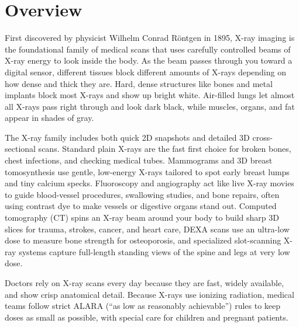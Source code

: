 \label{ch:infographic-xray-imaging-overview}

\section{Overview}

First discovered by physicist Wilhelm Conrad R\"ontgen in 1895, X-ray imaging is the foundational family of medical scans that uses carefully controlled beams of X-ray energy to look inside the body. As the beam passes through you toward a digital sensor, different tissues block different amounts of X-rays depending on how dense and thick they are. Hard, dense structures like bones and metal implants block most X-rays and show up bright white. Air-filled lungs let almost all X-rays pass right through and look dark black, while muscles, organs, and fat appear in shades of gray.

The X-ray family includes both quick 2D snapshots and detailed 3D cross-sectional scans. Standard plain X-rays are the fast first choice for broken bones, chest infections, and checking medical tubes. Mammograms and 3D breast tomosynthesis use gentle, low-energy X-rays tailored to spot early breast lumps and tiny calcium specks. Fluoroscopy and angiography act like live X-ray movies to guide blood-vessel procedures, swallowing studies, and bone repairs, often using contrast dye to make vessels or digestive organs stand out. Computed tomography (CT) spins an X-ray beam around your body to build sharp 3D slices for trauma, strokes, cancer, and heart care, DEXA scans use an ultra-low dose to measure bone strength for osteoporosis, and specialized slot-scanning X-ray systems capture full-length standing views of the spine and legs at very low dose.

Doctors rely on X-ray scans every day because they are fast, widely available, and show crisp anatomical detail. Because X-rays use ionizing radiation, medical teams follow strict ALARA (``as low as reasonably achievable'') rules to keep doses as small as possible, with special care for children and pregnant patients.

